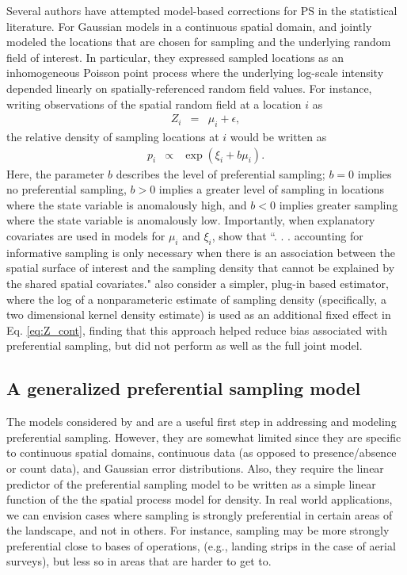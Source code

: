 \documentclass[times,mee,doublespace,]{besauth2}
\begin{document}
Several authors have attempted model-based corrections for PS in the statistical literature. For Gaussian models in a continuous spatial domain, \citet{DiggleEtAl2010} and \citet{PatiEtAl2011} jointly modeled the locations that are chosen for sampling and the underlying random field of interest.  In particular, they expressed sampled locations as an inhomogeneous Poisson point process where the underlying log-scale intensity depended linearly on spatially-referenced random field values.  For instance, writing observations of the spatial random field at a location $i$ as
\begin{eqnarray}
   Z_i & = & \mu_i + \epsilon,
   \label{eq:Z_cont}
\end{eqnarray}
the relative density of sampling locations at $i$ would be written as
\begin{eqnarray}
   p_i & \propto & \exp(\xi_i + b \mu_i).
   \label{eq:p_cont}
\end{eqnarray}
Here, the parameter $b$ describes the level of preferential sampling; $b=0$ implies no preferential sampling, $b>0$ implies a greater level of sampling in locations where the state variable is anomalously high, and $b<0$ implies greater sampling where the state variable is anomalously low.  Importantly, when explanatory covariates are used in models for $\mu_i$ and $\xi_i$, \citet{PatiEtAl2011} show that ``. . . accounting for informative sampling is only necessary when there
is an association between the spatial surface of interest and the sampling density that cannot be
explained by the shared spatial covariates."  \citet{PatiEtAl2011} also consider a simpler, plug-in based estimator, where the log of a nonparameteric estimate of sampling density (specifically, a two dimensional kernel density estimate) is used as an additional fixed effect in Eq. \ref{eq:Z_cont}, finding that this approach helped reduce bias associated with preferential sampling, but did not perform as well as the full joint model.

\subsection{A generalized preferential sampling model}

The models considered by \citet{DiggleEtAl2010} and \citet{PatiEtAl2011} are a useful first step in addressing and modeling preferential sampling.  However, they are somewhat limited since they are specific to continuous spatial domains, continuous data (as opposed to presence/absence or count data), and Gaussian error distributions.  Also, they require the linear predictor of the preferential sampling model to be written as a simple linear function of the the spatial process model for density.  In real world applications, we can envision cases where sampling is strongly preferential in certain areas of the landscape, and not in others.  For instance, sampling may be more strongly preferential close to bases of operations, (e.g., landing strips in the case of aerial surveys), but less so in areas that are harder to get to.
\end{document}
